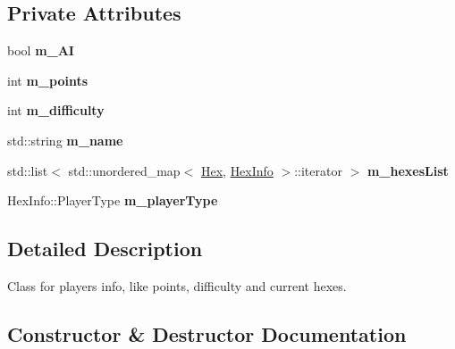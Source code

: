 \subsection*{Private Attributes}
\begin{DoxyCompactItemize}
\item 
bool {\bfseries m\+\_\+\+AI}\hypertarget{classPlayer_a4e71a5aa397a446e2aa4a8c8b087416d}{}\label{classPlayer_a4e71a5aa397a446e2aa4a8c8b087416d}

\item 
int {\bfseries m\+\_\+points}\hypertarget{classPlayer_af40b202e39d34b244b882aeead951552}{}\label{classPlayer_af40b202e39d34b244b882aeead951552}

\item 
int {\bfseries m\+\_\+difficulty}\hypertarget{classPlayer_a1c837a997ed609bc7934bb2a610d8092}{}\label{classPlayer_a1c837a997ed609bc7934bb2a610d8092}

\item 
std\+::string {\bfseries m\+\_\+name}\hypertarget{classPlayer_add634962cf5d664d2f7616af00082d80}{}\label{classPlayer_add634962cf5d664d2f7616af00082d80}

\item 
std\+::list$<$ std\+::unordered\+\_\+map$<$ \hyperlink{classHex}{Hex}, \hyperlink{structHexInfo}{Hex\+Info} $>$\+::iterator $>$ {\bfseries m\+\_\+hexes\+List}\hypertarget{classPlayer_a0726bfedf6ae4656f9fe07e5da6afb8a}{}\label{classPlayer_a0726bfedf6ae4656f9fe07e5da6afb8a}

\item 
Hex\+Info\+::\+Player\+Type {\bfseries m\+\_\+player\+Type}\hypertarget{classPlayer_abd23734528589fdbd3ed958e296f1f9b}{}\label{classPlayer_abd23734528589fdbd3ed958e296f1f9b}

\end{DoxyCompactItemize}


\subsection{Detailed Description}
Class for player\textquotesingle{}s info, like points, difficulty and current hexes. 

\subsection{Constructor \& Destructor Documentation}
